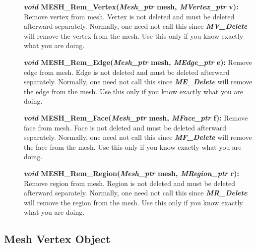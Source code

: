 \documentclass[12pt]{article}
\begin{document}
\begin{description}
\item[]\textbf{\textit{void} MESH\_Rem\_Vertex(\textit{Mesh\_ptr}
    mesh, \textit{MVertex\_ptr} v):} Remove vertex from mesh. Vertex
  is not deleted and must be deleted afterward separately. Normally,
  one need not call this since \textbf{\textit{MV\_Delete}} will
  remove the vertex from the mesh. Use this only if you know exactly
  what you are doing.

\item[]\textbf{\textit{void} MESH\_Rem\_Edge(\textit{Mesh\_ptr} mesh,
    \textit{MEdge\_ptr} e):} Remove edge from mesh. Edge is not
  deleted and must be deleted afterward separately. Normally, one need
  not call this since \textbf{\textit{ME\_Delete}} will remove the
  edge from the mesh. Use this only if you know exactly what you are
  doing.
  
\item[]\textbf{\textit{void} MESH\_Rem\_Face(\textit{Mesh\_ptr} mesh,
    \textit{MFace\_ptr} f):} Remove face from mesh. Face is not
  deleted and must be deleted afterward separately. Normally, one need
  not call this since \textbf{\textit{MF\_Delete}} will remove the
  face from the mesh. Use this only if you know exactly what you are
  doing.
  
\item[]\textbf{\textit{void} MESH\_Rem\_Region(\textit{Mesh\_ptr}
    mesh, \textit{MRegion\_ptr} r):} Remove region from mesh. Region
  is not deleted and must be deleted afterward separately. Normally,
  one need not call this since \textbf{\textit{MR\_Delete}} will
  remove the region from the mesh. Use this only if you know exactly
  what you are doing.
\end{description}

\newpage
\subsection{Mesh Vertex Object}
\end{document}
